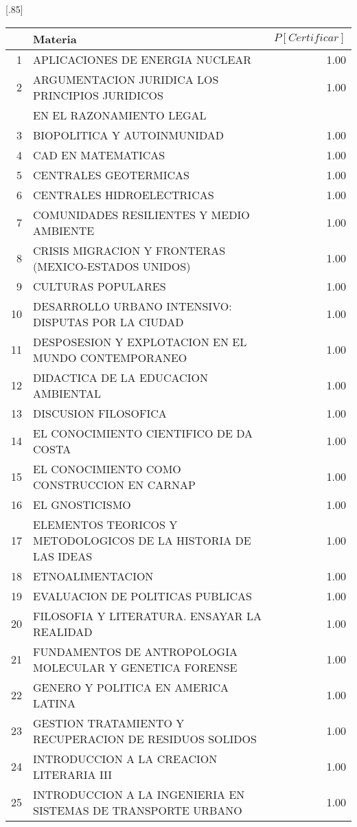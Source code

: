 \documentclass[12pt]{article}
\begin{document}
\begin{table}[ht]
\centering
\scalebox{0.75}[.85]{
\begin{tabular}{rlr}
  \hline
 & Materia & $P[Certificar]$ \\ 
  \hline
1 & APLICACIONES DE ENERGIA NUCLEAR & 1.00 \\ 
  2 & ARGUMENTACION JURIDICA LOS PRINCIPIOS JURIDICOS & 1.00 \\ 
   & EN EL RAZONAMIENTO LEGAL &  \\ 
  3 & BIOPOLITICA Y AUTOINMUNIDAD & 1.00 \\ 
  4 & CAD EN MATEMATICAS & 1.00 \\ 
  5 & CENTRALES GEOTERMICAS & 1.00 \\ 
  6 & CENTRALES HIDROELECTRICAS & 1.00 \\ 
  7 & COMUNIDADES RESILIENTES Y MEDIO AMBIENTE & 1.00 \\ 
  8 & CRISIS MIGRACION Y FRONTERAS (MEXICO-ESTADOS UNIDOS) & 1.00 \\ 
  9 & CULTURAS POPULARES & 1.00 \\ 
  10 & DESARROLLO URBANO INTENSIVO: DISPUTAS POR LA CIUDAD & 1.00 \\ 
  11 & DESPOSESION Y EXPLOTACION EN EL MUNDO CONTEMPORANEO & 1.00 \\ 
  12 & DIDACTICA DE LA EDUCACION AMBIENTAL & 1.00 \\ 
  13 & DISCUSION FILOSOFICA & 1.00 \\ 
  14 & EL CONOCIMIENTO CIENTIFICO DE DA COSTA & 1.00 \\ 
  15 & EL CONOCIMIENTO COMO CONSTRUCCION EN CARNAP & 1.00 \\ 
  16 & EL GNOSTICISMO & 1.00 \\ 
  17 & ELEMENTOS TEORICOS Y METODOLOGICOS DE LA HISTORIA DE LAS IDEAS & 1.00 \\ 
  18 & ETNOALIMENTACION & 1.00 \\ 
  19 & EVALUACION DE POLITICAS PUBLICAS & 1.00 \\ 
  20 & FILOSOFIA Y LITERATURA. ENSAYAR LA REALIDAD & 1.00 \\ 
  21 & FUNDAMENTOS DE ANTROPOLOGIA MOLECULAR Y GENETICA FORENSE & 1.00 \\ 
  22 & GENERO Y POLITICA EN AMERICA LATINA & 1.00 \\ 
  23 & GESTION TRATAMIENTO Y RECUPERACION DE RESIDUOS SOLIDOS & 1.00 \\ 
  24 & INTRODUCCION A LA CREACION LITERARIA III & 1.00 \\ 
  25 & INTRODUCCION A LA INGENIERIA EN SISTEMAS DE TRANSPORTE URBANO & 1.00 \\ 

\end{tabular}}
\end{table}
\end{document}
